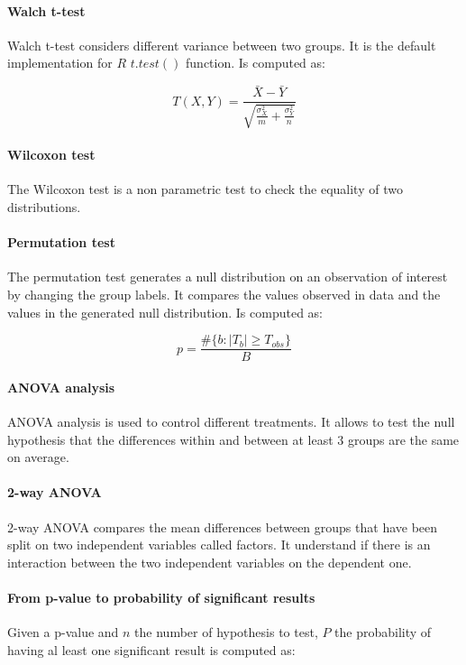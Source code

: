 			\paragraph{Walch t-test}
			Walch t-test considers different variance between two groups.
			It is the default implementation for $R$ $t.test()$ function.
			Is computed as:

			$$T(X, Y) = \frac{\bar{X}-\bar{Y}}{\sqrt{\frac{\sigma^2_{X}}{m}+\frac{\sigma^2_Y}{n}}}$$

			\paragraph{Wilcoxon test}
			The Wilcoxon test is a non parametric test to check the equality of two distributions.

			\paragraph{Permutation test}
			The permutation test generates a null distribution on an observation of interest by changing the group labels.
			It compares the values observed in data and the values in the generated null distribution.
			Is computed as:

			$$p = \frac{\#\{b:|T_b|\ge T_{obs}\}}{B}$$

			\paragraph{ANOVA analysis}
			ANOVA analysis is used to control different treatments.
			It allows to test the null hypothesis that the differences within and between at least $3$ groups are the same on average.

			\paragraph{2-way ANOVA}
			2-way ANOVA compares the mean differences between groups that have been split on two independent variables called factors.
			It understand if there is an interaction between the two independent variables on the dependent one.

			\paragraph{From p-value to probability of significant results}
			Given a p-value and $n$ the number of hypothesis to test, $P$ the probability of having al least one significant result is computed as:


